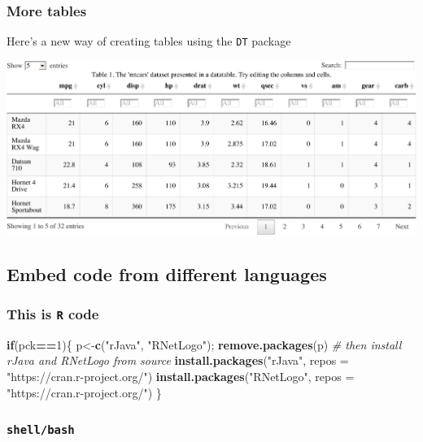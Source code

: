 \documentclass[article]{article}
\newenvironment{Shaded}{\begin{snugshade}}{\end{snugshade}}
\newcommand{\KeywordTok}[1]{\textcolor[rgb]{0.13,0.29,0.53}{\textbf{#1}}}
\newcommand{\DataTypeTok}[1]{\textcolor[rgb]{0.13,0.29,0.53}{#1}}
\newcommand{\DecValTok}[1]{\textcolor[rgb]{0.00,0.00,0.81}{#1}}
\newcommand{\StringTok}[1]{\textcolor[rgb]{0.31,0.60,0.02}{#1}}
\newcommand{\CommentTok}[1]{\textcolor[rgb]{0.56,0.35,0.01}{\textit{#1}}}
\newcommand{\ControlFlowTok}[1]{\textcolor[rgb]{0.13,0.29,0.53}{\textbf{#1}}}
\newcommand{\OperatorTok}[1]{\textcolor[rgb]{0.81,0.36,0.00}{\textbf{#1}}}
\newcommand{\NormalTok}[1]{#1}
\begin{document}
\subsubsection{More tables}\label{more-tables}

Here's a new way of creating tables using the \texttt{DT} package

\includegraphics{Lesson5_rmd_files/figure-latex/unnamed-chunk-5-1.pdf}

\subsection{Embed code from different
languages}\label{embed-code-from-different-languages}

\subsubsection{\texorpdfstring{This is \texttt{R}
code}{This is R code}}\label{this-is-r-code}

\begin{Shaded}
\begin{Highlighting}[]
\ControlFlowTok{if}\NormalTok{(pck}\OperatorTok{==}\DecValTok{1}\NormalTok{)\{}
\NormalTok{  p<-}\KeywordTok{c}\NormalTok{(}\StringTok{"rJava"}\NormalTok{, }\StringTok{"RNetLogo"}\NormalTok{); }\KeywordTok{remove.packages}\NormalTok{(p)}
  \CommentTok{# then install rJava and RNetLogo from source}
  \KeywordTok{install.packages}\NormalTok{(}\StringTok{"rJava"}\NormalTok{, }\DataTypeTok{repos =} \StringTok{"https://cran.r-project.org/"}\NormalTok{)}
  \KeywordTok{install.packages}\NormalTok{(}\StringTok{"RNetLogo"}\NormalTok{, }\DataTypeTok{repos =} \StringTok{"https://cran.r-project.org/"}\NormalTok{)}
\NormalTok{\}}
\end{Highlighting}
\end{Shaded}

\subsubsection{\texorpdfstring{\texttt{shell/bash}}{shell/bash}}\label{shellbash}
\end{document}
